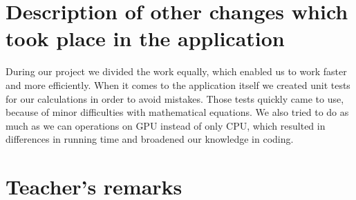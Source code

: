 \documentclass[12pt]{article}
\begin{document}
\section{Description of other changes which took place in the application}

During our project we divided the work equally,
which enabled us to work faster and more efficiently.
When it comes to the application itself we created unit tests for our calculations in order to avoid mistakes.
Those tests quickly came to use, because of minor difficulties with mathematical equations.
We also tried to do as much as we can operations on GPU instead of only CPU,
which resulted in differences in running time and broadened our knowledge in coding.


\vfill
\section*{Teacher's remarks}
\begin{tabularx}{\textwidth}{|X|}
    \hline
    \vspace{7cm}
    \phantom{.} \\
    \hline
\end{tabularx}
\end{document}
